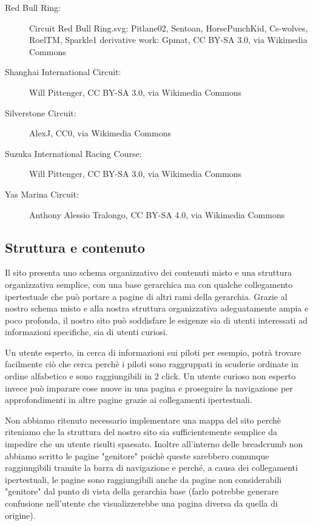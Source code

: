 \documentclass[11pt,a4paper]{article}
\begin{document}
\begin{description}
    \item[Red Bull Ring:] Circuit Red Bull Ring.svg: Pitlane02, Sentoan, HorsePunchKid, Cs-wolves, RoelTM, Sparkle1 derivative work: Gpmat, CC BY-SA 3.0, via Wikimedia Commons
    \item[Shanghai International Circuit:] Will Pittenger, CC BY-SA 3.0, via Wikimedia Commons
    \item[Silverstone Circuit:] AlexJ, CC0, via Wikimedia Commons
    \item[Suzuka International Racing Course:] Will Pittenger, CC BY-SA 3.0, via Wikimedia Commons
    \item[Yas Marina Circuit:] Anthony Alessio Tralongo, CC BY-SA 4.0, via Wikimedia Commons
\end{description}\subsection{Struttura e contenuto}
Il sito presenta uno schema organizzativo dei contenuti misto e una struttura organizzativa semplice, con una base gerarchica ma con qualche collegamento ipertestuale che può portare a pagine di altri rami della gerarchia.
Grazie al nostro schema misto e alla nostra struttura organizzativa adeguatamente ampia e poco profonda, il nostro sito può soddisfare le esigenze sia di utenti interessati ad informazioni specifiche, sia di utenti curiosi.

\vspace{0.5cm}

Un utente esperto, in cerca di informazioni sui piloti per esempio, potrà trovare facilmente ciò che cerca perchè i piloti sono raggruppati in scuderie ordinate in ordine alfabetico e sono raggiungibili in 2 click.
Un utente curioso non esperto invece può imparare cose nuove in una pagina e proseguire la navigazione per approfondimenti in altre pagine grazie ai collegamenti ipertestuali.

\vspace{0.5cm}

Non abbiamo ritenuto necessario implementare una mappa del sito perchè riteniamo che la struttura del nostro sito sia sufficientemente semplice da impedire che un utente risulti spaesato.
Inoltre all'interno delle breadcrumb non abbiamo scritto le pagine "genitore" poichè queste sarebbero comunque raggiungibili tramite la barra di navigazione e perché, a causa dei collegamenti ipertestuali, le pagine sono raggiungibili anche da pagine
non considerabili "genitore" dal punto di vista della gerarchia base (farlo potrebbe generare confusione nell'utente che visualizzerebbe una pagina diversa da quella di origine). 
\end{document}
